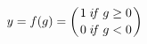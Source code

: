 \documentclass[10pt]{article}
\begin{document}
\begin{align*}y = f(g) = \bigg( {1 \; i\!f \; g \geq 0 \atop 0 \; i\!f \; g < 0} \bigg)\end{align*}
\end{document}

